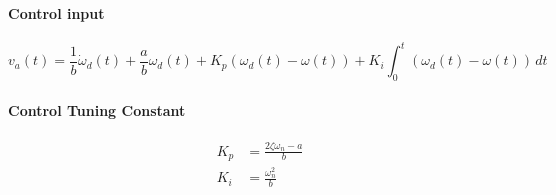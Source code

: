 \begin{tcolorbox}[title=Velocity Control using PI Linear]
	\paragraph{Control input}
	\[v_a(t) = \frac{1}{b}\dot{\omega}_d(t) + \frac{a}{b}\omega_d(t) + K_p(\omega_d(t) - \omega(t)) + K_i \int_{0}^{t} (\omega_d(t) - \omega(t)) \,dt\]
	\paragraph{Control Tuning Constant}
	\[
	\begin{split}
		K_p      &= \frac{2\zeta\omega_n - a}{b} \\
		K_i      &= \frac{\omega_n^2}{b}
	\end{split}
	\]
\end{tcolorbox}

